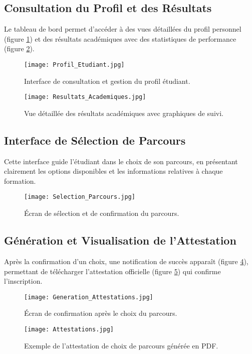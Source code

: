\documentclass[12pt,a4paper]{report}
\begin{document}
\subsection{Consultation du Profil et des Résultats}
Le tableau de bord permet d'accéder à des vues détaillées du profil personnel (figure \ref{fig:capture_profil}) et des résultats académiques avec des statistiques de performance (figure \ref{fig:capture_resultats}).
\begin{figure}[H]
    \centering
    \texttt{[image: Profil\_Etudiant.jpg]}
    \caption{Interface de consultation et gestion du profil étudiant.}
    \label{fig:capture_profil}
\end{figure}
\begin{figure}[H]
    \centering
    \texttt{[image: Resultats\_Academiques.jpg]}
    \caption{Vue détaillée des résultats académiques avec graphiques de suivi.}
    \label{fig:capture_resultats}
\end{figure}

\subsection{Interface de Sélection de Parcours}
Cette interface guide l'étudiant dans le choix de son parcours, en présentant clairement les options disponibles et les informations relatives à chaque formation.
\begin{figure}[H]
    \centering
    \texttt{[image: Selection\_Parcours.jpg]}
    \caption{Écran de sélection et de confirmation du parcours.}
    \label{fig:capture_selection}
\end{figure}

\subsection{Génération et Visualisation de l'Attestation}
Après la confirmation d'un choix, une notification de succès apparaît (figure \ref{fig:capture_generation}), permettant de télécharger l'attestation officielle (figure \ref{fig:capture_attestation}) qui confirme l'inscription.
\begin{figure}[H]
    \centering
    \texttt{[image: Generation\_Attestations.jpg]}
    \caption{Écran de confirmation après le choix du parcours.}
    \label{fig:capture_generation}
\end{figure}
\begin{figure}[H]
    \centering
    \texttt{[image: Attestations.jpg]}
    \caption{Exemple de l'attestation de choix de parcours générée en PDF.}
    \label{fig:capture_attestation}
\end{figure}
\end{document}
